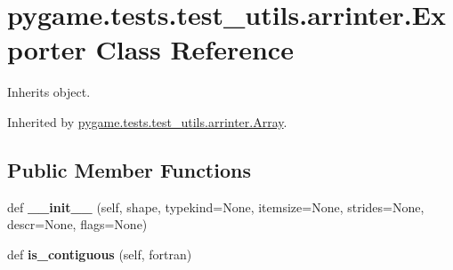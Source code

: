 \hypertarget{classpygame_1_1tests_1_1test__utils_1_1arrinter_1_1_exporter}{}\section{pygame.\+tests.\+test\+\_\+utils.\+arrinter.\+Exporter Class Reference}
\label{classpygame_1_1tests_1_1test__utils_1_1arrinter_1_1_exporter}


Inherits object.



Inherited by \hyperlink{classpygame_1_1tests_1_1test__utils_1_1arrinter_1_1_array}{pygame.\+tests.\+test\+\_\+utils.\+arrinter.\+Array}.

\subsection*{Public Member Functions}
\begin{DoxyCompactItemize}
\item 
\mbox{\label{classpygame_1_1tests_1_1test__utils_1_1arrinter_1_1_exporter_a3870c99aff8605b92c05e67f149fadf4}} 
def {\bfseries \+\_\+\+\_\+init\+\_\+\+\_\+} (self, shape, typekind=None, itemsize=None, strides=None, descr=None, flags=None)
\item 
\mbox{\label{classpygame_1_1tests_1_1test__utils_1_1arrinter_1_1_exporter_a0967aa1cecf4c5ffc1abc67513b7a570}} 
def {\bfseries is\+\_\+contiguous} (self, fortran)
\end{DoxyCompactItemize}
